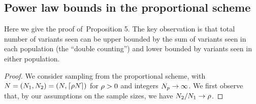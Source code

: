 \subsection{Power law bounds in the proportional scheme}
\label{sec:proportion_scheme_proof}
Here we give the proof of~Proposition 5. The key observation is that total number of variants seen can be upper bounded by the sum of variants seen in each population (the ``double counting'') and lower bounded by variants seen in either population. 

\begin{proof}
We consider sampling from the proportional scheme, with $\vecsamplesize = (\samplesize{1},\samplesize{2})=(\samplesize{},\lceil\propt\samplesize{}\rceil)$ for $\rho>0$ and integers $N_{p}\to\infty$. We first observe that, by our assumptions on the sample sizes, we have $N_{2}/N_{1}\to\rho$.


\end{proof}
